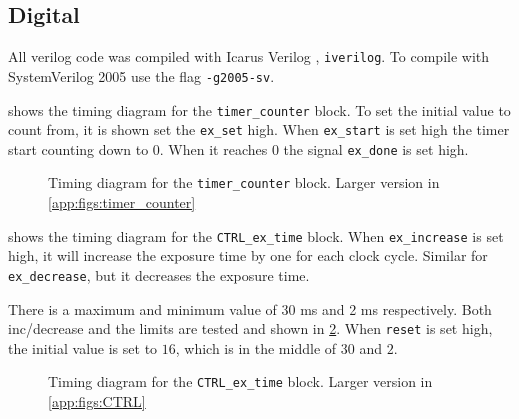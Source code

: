 \subsection{Digital}

All verilog code was compiled with Icarus Verilog \cite{williams_2020}, \texttt{iverilog}. 
To compile with SystemVerilog 2005 use the flag \texttt{-g2005-sv}.

 shows the timing diagram for the \texttt{timer\_counter} block.
To set the initial value to count from, it is shown set the \texttt{ex\_set} high.
When \texttt{ex\_start} is set high the timer start counting down to $0$.
When it reaches $0$ the signal \texttt{ex\_done} is set high.

\begin{figure}[!htbp]
    \centering
    \caption{Timing diagram for the \texttt{timer\_counter} block. Larger version in \cref{app:figs:timer_counter}}
    \label{fig:res:dig:timer}
\end{figure}

 shows the timing diagram for the \texttt{CTRL\_ex\_time} block.
When \texttt{ex\_increase} is set high, it will increase the exposure time by one for each clock cycle.
Similar for \texttt{ex\_decrease}, but it decreases the exposure time. 

There is a maximum and minimum value of 30 ms and 2 ms respectively. 
Both inc/decrease and the limits are tested and shown in \cref{fig:res:dig:CTRL}.
When \texttt{reset} is set high, the initial value is set to $16$, which is in the middle of $30$ and $2$.

\begin{figure}[!htbp]
    \centering
    \caption{Timing diagram for the \texttt{CTRL\_ex\_time} block. Larger version in \cref{app:figs:CTRL}}
    \label{fig:res:dig:CTRL}
\end{figure}

